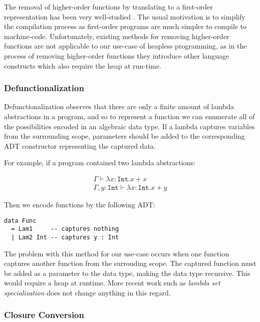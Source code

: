 \documentclass[runningheads]{llncs}
\begin{document}
The removal of higher-order functions by translating to a first-order representation has been very well-studied \cite{minamide1996typed,brandon2023better,chin1996higher}. The usual motivation is to simplify the compilation process as first-order programs are much simpler to compile to machine-code. Unfortunately, existing methods for removing higher-order functions are not applicable to our use-case of heapless programming, as in the process of removing higher-order functions they introduce other language constructs which also require the heap at run-time.

\subsubsection{Defunctionalization}

Defunctionalization observes that there are only a finite amount of lambda abstractions in a program, and so to represent a function we can enumerate all of the possibilities encoded in an algebraic data type. If a lambda captures variables from the surrounding scope, parameters should be added to the corresponding ADT constructor representing the captured data.

For example, if a program contained two lambda abstractions:

\begin{align}
  \Gamma \vdash \lambda x : \texttt{Int}. x + x \\
  \Gamma , y : \texttt{Int} \vdash \lambda x : \texttt{Int}. x + y
\end{align}

Then we encode functions by the following ADT:

\begin{verbatim}
data Func
  = Lam1     -- captures nothing
  | Lam2 Int -- captures y : Int
\end{verbatim}

The problem with this method for our use-case occurs when one function captures another function from the surrouding scope. The captured function must be added as a parameter to the data type, making the data type recursive. This would require a heap at runtime. More recent work such as \emph{lambda set specialization} \cite{brandon2023better} does not change anything in this regard.

\subsubsection{Closure Conversion}
\end{document}
